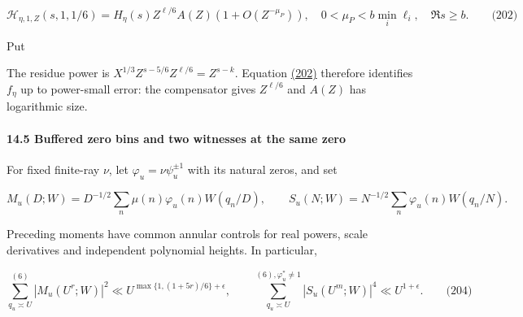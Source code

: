 \label{dr:prime-residue}

\[
\mathcal H_{\eta,1,Z}(s,1,1/6)
 =H_\eta(s)Z^{\ell/6}A(Z)(1+O(Z^{-\mu_P})),
 \quad 0<\mu_P<b\min_i\ell_i,\quad\Re s\ge b.
 \qquad\text{(202)}
\]

Put

\hypertarget{dr:J-f}{}

\label{dr:J-f}

\par\noindent\resizebox{\linewidth}{!}{\begin{minipage}{\dimexpr\linewidth+16.83815pt\relax}\[
h=1+\ell-x,\quad k=\tfrac56-\tfrac x3-\tfrac\ell6,
 \qquad J_\eta(Z)=\frac{I_\eta^{\rm comp}(Z)}{c_S A(Z)},
 \quad
 f_\eta(Z)=\frac1{2\pi i}\int_{(2)}Z^{s-k}
 e^{(s-5/6)^2}\frac{H_\eta(s)}{L_K^S(s,\eta)}\,ds.
 \qquad\text{(203)}
\]\end{minipage}}\par

The residue power is \(X^{1/3}Z^{s-5/6}Z^{\ell/6}=Z^{s-k}\). Equation \protect\hyperlink{dr:prime-residue}{(202)} therefore identifies \(f_\eta\) up to power-small error: the compensator gives \(Z^{\ell/6}\) and \(A(Z)\) has logarithmic size.

\hypertarget{dr:detection}{}

\label{dr:detection}

\hypertarget{buffered-zero-bins-and-two-witnesses-at-the-same-zero}{%
\paragraph{14.5 Buffered zero bins and two witnesses at the same zero}\label{buffered-zero-bins-and-two-witnesses-at-the-same-zero}}

For fixed finite-ray \(\nu\), let \(\varphi_u=\nu\psi_u^{\pm1}\) with its natural zeros, and set

\[
M_u(D;W)=D^{-1/2}\sum_n\mu(n)\varphi_u(n)W(q_n/D),\qquad
 S_u(N;W)=N^{-1/2}\sum_n\varphi_u(n)W(q_n/N).
\]

Preceding moments have common annular controls for real powers, scale derivatives and independent polynomial heights. In particular,

\hypertarget{dr:unmarked}{}

\label{dr:unmarked}

\[
\sum_{q_u\asymp U}^{(6)}|M_u(U^r;W)|^2
 \ll U^{\max\{1,(1+5r)/6\}+\epsilon},\qquad
 \sum_{q_u\asymp U}^{(6),\varphi_u^*\ne1}|S_u(U^m;W)|^4
 \ll U^{1+\epsilon}.
 \qquad\text{(204)}
\]

